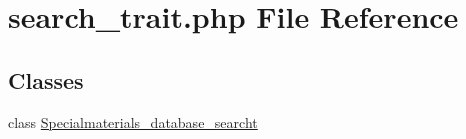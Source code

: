 \hypertarget{search__trait_8php}{\section{search\+\_\+trait.\+php File Reference}
\label{search__trait_8php}
}
\subsection*{Classes}
\begin{DoxyCompactItemize}
\item 
class \hyperlink{classSpecialmaterials__database__searcht}{Specialmaterials\+\_\+database\+\_\+searcht}
\end{DoxyCompactItemize}
